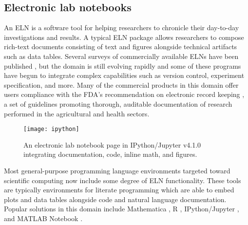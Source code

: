 \documentclass[../thesis]{subfiles}
\begin{document}
\subsection{Electronic lab notebooks}
An \gls{ELN} is a software tool for helping
researchers to chronicle their day-to-day investigations and
results. A typical \gls{ELN} package allows researchers to compose
rich-text documents consisting of text and figures alongside technical
\glspl{artifact} such as data tables. Several surveys of
commercially available ELNs have been published
\cite{Rubacha2011, Dirnagl2016}, but the domain is still evolving
rapidly and some of these programs have begun to integrate complex
capabilities such as version control, experiment specification, and
more. Many of the commercial products in this domain
offer users compliance with the FDA's recommendation on electronic
record keeping \cite{FDA}, a set of guidelines promoting thorough,
auditable documentation of research performed in the agricultural and
health sectors.

\begin{figure}
  \texttt{[image: ipython]}
  \caption{
    An electronic lab notebook page in IPython/Jupyter v4.1.0
    \cite{IPython} integrating documentation, code, inline math,
    and figures.
    \label{fig:Ipython}
  }
\end{figure}

Most general-purpose programming language environments targeted toward
scientific computing now include some degree of ELN
functionality. These tools are typically environments for literate
programming \cite{Knuth:1984:LP:473.479} which are able to embed plots
and data tables alongside code and natural language
documentation. Popular solutions in this domain include Mathematica
\cite{mathematica}, R \cite{Rlang}, IPython/Jupyter \cite{IPython},
and MATLAB Notebook \cite{MATLAB}.
\end{document}
